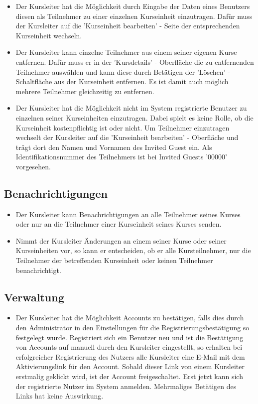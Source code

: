 \documentclass[a4paper]{scrreprt}
\begin{document}
\begin{itemize}
				\item {}
					Der Kursleiter hat die Möglichkeit durch Eingabe der Daten eines Benutzers diesen als Teilnehmer zu einer einzelnen Kurseinheit einzutragen. Dafür muss der Kursleiter auf die 'Kurseinheit bearbeiten' - Seite der entsprechenden Kurseinheit wechseln.
				\item {}
					Der Kursleiter kann einzelne Teilnehmer aus einem seiner eigenen Kurse entfernen. Dafür muss er in der 'Kursdetails' - Oberfläche die zu entfernenden Teilnehmer auswählen und kann diese durch Betätigen der 'Löschen' - Schaltfläche aus der Kurseinheit entfernen. Es ist damit auch möglich mehrere Teilnehmer gleichzeitig zu entfernen.
				\item {}
					Der Kursleiter hat die Möglichkeit nicht im System registrierte Benutzer zu einzelnen seiner Kurseinheiten einzutragen. Dabei spielt es keine Rolle, ob die Kurseinheit kostenpflichtig ist oder nicht. Um Teilnehmer einzutragen wechselt der Kursleiter auf die 'Kurseinheit bearbeiten' - Oberfläche und trägt dort den Namen und Vornamen des Invited Guest ein. Als Identifikationsnummer des Teilnehmers ist bei Invited Guests '00000' vorgesehen.
			\end{itemize}

		\subsection{Benachrichtigungen}
			\begin{itemize}
				\item {}
					Der Kursleiter kann Benachrichtigungen an alle Teilnehmer seines Kurses oder nur an die Teilnehmer einer Kurseinheit seines Kurses senden.
				\item {}	
					Nimmt der Kursleiter Änderungen an einem seiner Kurse oder seiner Kurseinheiten vor, so kann er entscheiden, ob er alle Kursteilnehmer, nur die Teilnehmer der betreffenden Kurseinheit oder keinen Teilnehmer benachrichtigt.
			\end{itemize}

		\subsection{Verwaltung}
			\begin{itemize}
				\item {}
					Der Kursleiter hat die Möglichkeit Accounts zu bestätigen, falls dies durch den Administrator in den Einstellungen für die Registrierungsbestätigung so festgelegt wurde. Registriert sich ein Benutzer neu und ist die Bestätigung von Accounts auf manuell durch den Kursleiter eingestellt, so erhalten bei erfolgreicher Registrierung des Nutzers alle Kursleiter eine E-Mail mit dem Aktivierungslink für den Account. Sobald dieser Link von einem Kursleiter erstmalig geklickt wird, ist der Account freigeschaltet. Erst jetzt kann sich der registrierte Nutzer im System anmelden. Mehrmaliges Betätigen des Links hat keine Auswirkung.
			\end{itemize}
\end{document}
